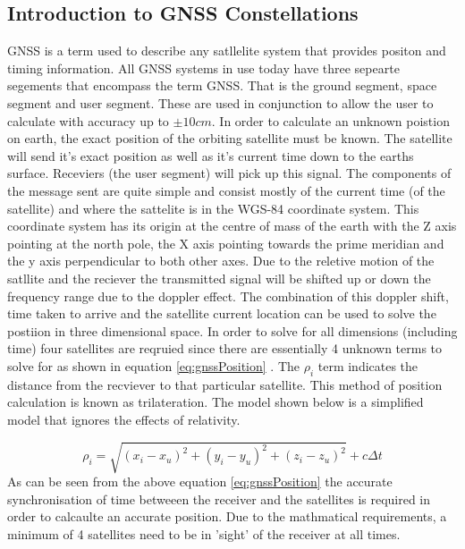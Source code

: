 \subsection{Introduction to GNSS Constellations}
GNSS is a term used to describe any satllelite system that provides positon and timing information. All GNSS systems in use today have three sepearte segements that
encompass the term GNSS. That is the ground segment, space segment and user segment. These are used in conjunction to allow the user to calculate with accuracy up to $\pm
10cm$. In order to calculate an unknown poistion on earth, the exact position of the orbiting satellite must be known. The satellite will send it's exact position as well
as it's current time down to the earths surface. Receviers (the user segment) will pick up this signal. The components of the message sent are quite simple and consist
mostly of the current time (of the satellite) and where the sattelite is in the WGS-84 coordinate system\cite{RN46}. This coordinate system has its origin at the centre of mass of
the earth with the Z axis pointing at the north pole, the X axis pointing towards the prime meridian and the y axis perpendicular to both other axes. Due to the reletive
motion of the satllite and the reciever the transmitted signal will be shifted up or down the frequency range due to the doppler effect. The combination of this doppler
shift, time taken to arrive and the satellite current location can be used to solve the postiion in three dimensional space. In order to solve for all dimensions
(including time) four satellites are reqruied since there are essentially 4 unknown terms to solve for as shown in equation \ref{eq:gnssPosition} \cite{RN46}. The
$\rho_i$ term indicates the distance from the recviever to that particular satellite. This method of position calculation is known as trilateration. The model shown below
is a simplified model that ignores the effects of relativity. 

\begin{equation} \label{eq:gnssPosition} 
    \rho_i = \sqrt{(x_i - x_u)^2 + (y_i - y_u)^2 + (z_i - z_u)^2} + c \Delta t
\end{equation}
As can be seen from the above equation \ref{eq:gnssPosition} the accurate synchronisation of time betweeen the receiver and the satellites is required in order to
calcaulte an accurate position. Due to the mathmatical requirements, a minimum of 4 satellites need to be in 'sight' of the receiver at all times.

